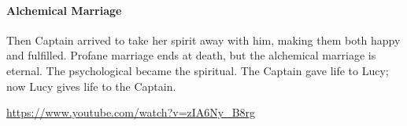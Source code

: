\paragraph{Alchemical Marriage}
Then Captain arrived to take her spirit away with him, making them both happy and fulfilled. Profane marriage ends at death, but the alchemical marriage is eternal. The psychological became the spiritual. The Captain gave life to Lucy; now Lucy gives life to the Captain.


\url{https://www.youtube.com/watch?v=zIA6Ny\_B8rg}

